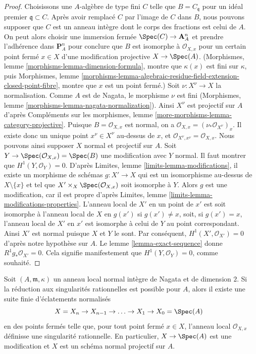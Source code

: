 \begin{proof} Choisissons une $A$-algèbre de type fini $C$ telle que $B = C_\mathfrak q$ pour un idéal premier $\mathfrak q \subset C$. Après avoir remplacé $C$ par l'image de $C$ dans $B$, nous pouvons supposer que $C$ est un anneau intègre dont le corps des fractions est celui de $A$. On peut alors choisir une immersion fermée $\Spec(C) \to \mathbf{A}^n_A$ et prendre l'adhérence dans $\mathbf{P}^n_A$ pour conclure que $B$ est isomorphe à $\mathcal{O}_{X, x}$ pour un certain point fermé $x \in X$ d'une modification projective $X \to \Spec(A)$. (Morphismes, lemme \ref{morphisms-lemma-dimension-formula}, montre que $\kappa(x)$ est fini sur $\kappa$, puis Morphismes, lemme \ref{morphisms-lemma-algebraic-residue-field-extension-closed-point-fibre}, montre que $x$ est un point fermé.) Soit $\nu : X^\nu \to X$ la normalisation. Comme $A$ est de Nagata, le morphisme $\nu$ est fini (Morphismes, lemme \ref{morphisms-lemma-nagata-normalization}). Ainsi $X^\nu$ est projectif sur $A$ d'après Compléments sur les morphismes, lemme \ref{more-morphisms-lemma-category-projective}. Puisque $B = \mathcal{O}_{X, x}$ est normal, on a $\mathcal{O}_{X, x} = (\nu_*\mathcal{O}_{X^\nu})_x$. Il existe donc un unique point $x^\nu \in X^\nu$ au-dessus de $x$, et $\mathcal{O}_{X^\nu, x^\nu} = \mathcal{O}_{X, x}$. Nous pouvons ainsi supposer $X$ normal et projectif sur $A$. Soit $Y \to \Spec(\mathcal{O}_{X, x}) = \Spec(B)$ une modification avec $Y$ normal. Il faut montrer que $H^1(Y, \mathcal{O}_Y) = 0$. D'après Limites, lemme \ref{limits-lemma-modifications}, il existe un morphisme de schémas $g : X' \to X$ qui est un isomorphisme au-dessus de $X \setminus \{x\}$ et tel que $X' \times_X \Spec(\mathcal{O}_{X, x})$ soit isomorphe à $Y$. Alors $g$ est une modification, car il est propre d'après Limites, lemme \ref{limits-lemma-modifications-properties}. L'anneau local de $X'$ en un point de $x'$ est soit isomorphe à l'anneau local de $X$ en $g(x')$ si $g(x') \not = x$, soit, si $g(x') = x$, l'anneau local de $X'$ en $x'$ est isomorphe à celui de $Y$ au point correspondant. Ainsi $X'$ est normal puisque $X$ et $Y$ le sont. Par conséquent, $H^1(X', \mathcal{O}_{X'}) = 0$ d'après notre hypothèse sur $A$. Le lemme \ref{lemma-exact-sequence} donne $R^1g_*\mathcal{O}_{X'} = 0$. Cela signifie manifestement que $H^1(Y, \mathcal{O}_Y) = 0$, comme souhaité. \end{proof}

\begin{lemma} \label{lemma-reduce-to-rational} Soit $(A, \mathfrak m, \kappa)$ un anneau local normal intègre de Nagata et de dimension $2$. Si la réduction aux singularités rationnelles est possible pour $A$, alors il existe une suite finie d'éclatements normalisés $$
X = X_n \to X_{n - 1} \to \ldots \to X_1 \to X_0 = \Spec(A)
$$ en des points fermés telle que, pour tout point fermé $x \in X$, l'anneau local $\mathcal{O}_{X, x}$ définisse une singularité rationnelle. En particulier, $X \to \Spec(A)$ est une modification et $X$ est un schéma normal projectif sur $A$. \end{lemma}

